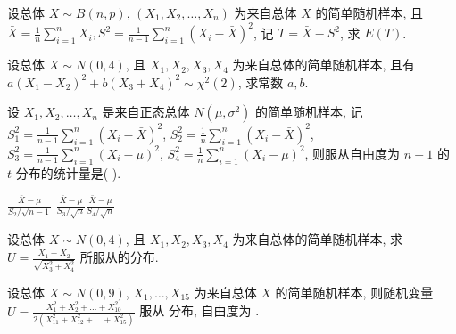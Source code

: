 \documentclass[padp]{ExBook}
\begin{document}
\clearpage 






\begin{qitems}

    \begin{bbox}
        \qitem 设总体 $X \sim B(n, p)$, $(X_1, X_2, \dots, X_n)$ 为来自总体 $X$ 的简单随机样本, 且
$\bar{X} = \frac{1}{n}\sum_{i=1}^{n}X_i, S^2 = \frac{1}{n-1}\sum_{i=1}^{n}(X_i-\bar{X})^2$, 记 $T = \bar{X}-S^2$, 求 $E(T)$.
    \end{bbox}

    \begin{bbox}
        \qitem 设总体 $X \sim N(0, 4)$, 且 $X_1, X_2, X_3, X_4$ 为来自总体的简单随机样本, 且有 $a(X_1-X_2)^2 + b(X_3+X_4)^2 \sim \chi^2(2)$, 求常数 $a, b$.
    \end{bbox}

    \begin{bbox}
        \qitem   设 $X_1, X_2, \dots, X_n$ 是来自正态总体 $N(\mu, \sigma^2)$ 的简单随机样本, 记
$S_1^2 = \frac{1}{n-1}\sum_{i=1}^{n}(X_i - \bar{X})^2$, $S_2^2 = \frac{1}{n}\sum_{i=1}^{n}(X_i - \bar{X})^2$,
$S_3^2 = \frac{1}{n-1}\sum_{i=1}^{n}(X_i - \mu)^2$, $S_4^2 = \frac{1}{n}\sum_{i=1}^{n}(X_i - \mu)^2$,
则服从自由度为 $n-1$ 的 $t$ 分布的统计量是( \quad ).

{$\frac{\bar{X}-\mu}{S_2/\sqrt{n-1}}$}
{$\frac{\bar{X}-\mu}{S_3/\sqrt{n}}$}{$\frac{\bar{X}-\mu}{S_4/\sqrt{n}}$}
    \end{bbox}

    \begin{bbox}
        \qitem   设总体 $X \sim N(0, 4)$, 且 $X_1, X_2, X_3, X_4$ 为来自总体的简单随机样本, 求 $U = \frac{X_1-X_2}{\sqrt{X_3^2+X_4^2}}$ 所服从的分布.
    \end{bbox}

    \begin{bbox}
        \qitem  设总体 $X \sim N(0, 9)$, $X_1, \dots, X_{15}$ 为来自总体 $X$ 的简单随机样本, 则随机变量 $U = \frac{X_1^2+X_2^2+\dots+X_{10}^2}{2(X_{11}^2+X_{12}^2+\dots+X_{15}^2)}$ 服从 \blankline 分布, 自由度为 \blankline.
    \end{bbox}


\end{qitems}
\end{document}
